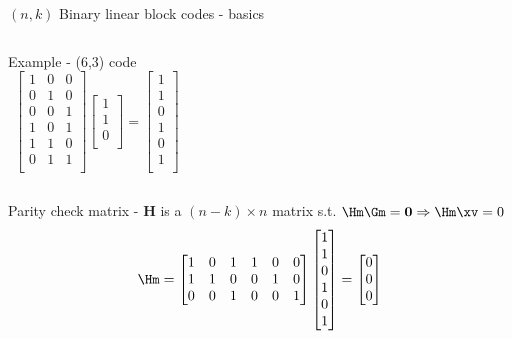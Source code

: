 \begin{frame}{$(n,k)$ Binary linear block codes - basics}
\begin{columns}[t]
\begin{block}{Example - (6,3) code}
\[
\ \
\begin{bmatrix}
  1 & 0 & 0 \\
  0 & 1 & 0 \\
  0 & 0 & 1 \\
  1 & 0 & 1 \\
  1 & 1 & 0 \\
  0 & 1 & 1 \\
\end{bmatrix}
\begin{bmatrix}
  1 \\
  1 \\
  0 \\
\end{bmatrix}
=
\begin{bmatrix}
1\\
1\\
0\\
1\\
0\\
1\\
\end{bmatrix}
\]
\end{block}
\end{columns}
\pause
\begin{block}{Parity check matrix - $\mathbf{H}$ is a $(n-k) \times n$ matrix s.t. $\Hm \Gm = \mathbf{0} \Rightarrow \Hm \xv = 0$}
\[
\Hm = \begin{bmatrix}
  1 & 0 & 1 & 1 & 0 & 0 \\
  1 & 1 & 0 & 0 & 1 & 0 \\
  0 & 0 & 1 & 0 & 0 & 1 \\
\end{bmatrix}
\begin{bmatrix}
1\\
1\\
0\\
1\\
0\\
1\\
\end{bmatrix}
=
\begin{bmatrix}
0\\
0\\
0\\
\end{bmatrix}
\]
\end{block}
\end{frame}


